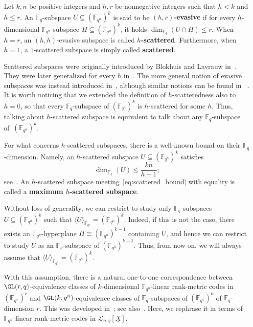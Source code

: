 \begin{defi}
Let $k,n$ be positive integers and $h,r$ be nonnegative integers such that $h<k$ and $h \le r$. An $\mathbb{F}_q$-subspace $U\subseteq (\mathbb{F}_{q^n})^k$ is said to be \textbf{$(h,r)$-evasive} if for every $h$-dimensional ${\mathbb F}_{q^n}$-subspace  $H\subseteq (\mathbb{F}_{q^n})^k$, it holds $\dim_{\mathbb{F}_q}(U\cap H)\leq r$. When~$h=r$, an  $(h,h)$-evasive subspace is called \textbf{$h$-scattered}. Furthermore, when $h=1$,  a $1$-scattered subspace is simply called \textbf{scattered}.
\end{defi}

Scattered subspaces were originally introduced by Blokhuis and Lavrauw in~\cite{blokhuis2000scattered}. They were later generalized for every $h$ in~\cite{csajbok2021generalising}. The more general notion of evasive subspaces was instead introduced in~\cite{bartoli2021evasive}, although similar notions can be found in ~\cite{pudlak2004pseudorandom,guruswami2011linear,dvir2012subspace,guruswami2016explicit}. 
It is worth noticing that we extended the definition of $h$-scatteredness also to $h=0$, so that every $\mathbb{F}_q$-subspace of $(\mathbb{F}_{q^n})^k$ is $h$-scattered for some $h$. Thus,  talking about $h$-scattered subspace is equivalent to talk about any $\mathbb{F}_q$-subspace of~$(\mathbb{F}_{q^n})^k$.

For what concerns $h$-scattered subspaces, there is a well-known bound on their $\mathbb{F}_q$-dimension. Namely, an $h$-scattered subspace $U\subseteq (\mathbb{F}_{q^n})^k$ satisfies
\begin{equation}\label{eq:scattered_bound}\dim_{\mathbb{F}_q}(U)\leq \frac{kn}{h+1};\end{equation}
see~\cite{blokhuis2000scattered,csajbok2021generalising}. An $h$-scattered subspace meeting~\eqref{eq:scattered_bound} with equality is called a \textbf{maximum $h$-scattered subspace}.

Without loss of generality, we can restrict to study only $\mathbb{F}_q$-subspaces $U\subseteq (\mathbb{F}_{q^n})^k$ such that $\langle U\rangle_{{\mathbb F}_{q^n}}=(\mathbb{F}_{q^n})^k$. Indeed, if this is not the case, there exists an ${\mathbb F}_{q^n}$-hyperplane $H\cong (\mathbb{F}_{q^n})^{k-1}$ containing $U$, and hence we can restrict to study $U$ as an $\mathbb{F}_q$-subspace of $(\mathbb{F}_{q^n})^{k-1}$. Thus, from now on, we will always assume that $\langle U \rangle_{{\mathbb F}_{q^n}}=(\mathbb{F}_{q^n})^k$.

With this assumption,  there is a natural one-to-one correspondence between $\GL(r,q)$-equivalence classes of
$k$-dimensional ${\mathbb F}_{q^n}$-linear rank-metric codes in $(\mathbb{F}_{q^n})^{r}$ and $\GL(k,q^n)$-equivalence classes of $\mathbb{F}_q$-subspaces of $(\mathbb{F}_{q^n})^k$ of $\mathbb{F}_q$-dimension $r$. This was developed in~\cite{randrianarisoa2020geometric}; see also~\cite{ABNR22}. Here, we rephrase it in terms of ${\mathbb F}_{q^n}$-linear rank-metric codes  in $\mathcal{L}_{n,q}[\underline{X}]$. 

